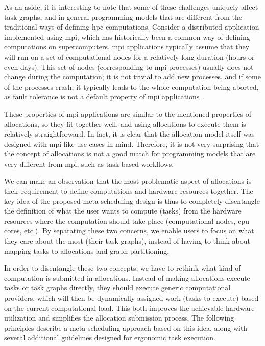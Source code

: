 As an aside, it is interesting to note that some of these challenges uniquely affect task graphs,
and in general programming models that are different from the traditional ways of defining
\gls{hpc} computations. Consider a distributed application implemented using
\gls{mpi}, which has historically been a common way of defining computations on
supercomputers. \gls{mpi} applications typically assume that they will run on a set
of computational nodes for a relatively long duration (hours or even days). This set of nodes
(corresponding to \gls{mpi} processes) usually does not change during the
computation; it is not trivial to add new processes, and if some of the processes crash, it
typically leads to the whole computation being aborted, as fault tolerance is not a default
property of \gls{mpi} applications~\cite{fault_tolerant_mpi}.

These properties of \gls{mpi} applications are similar to the mentioned properties of
allocations, so they fit together well, and using allocations to execute them is relatively
straightforward. In fact, it is clear that the allocation model itself was designed with
\gls{mpi}-like use-cases in mind. Therefore, it is not very surprising that the
concept of allocations is not a good match for programming models that are very different from
\gls{mpi}, such as task-based workflows.

We can make an observation that the most problematic aspect of allocations is their requirement to
define computations and hardware resources together. The key idea of the proposed meta-scheduling
design is thus to completely disentangle the definition of what the user wants to compute (tasks)
from the hardware resources where the computation should take place (computational nodes,
\gls{cpu} cores, etc.). By separating these two concerns, we enable users to focus on
what they care about the most (their task graphs), instead of having to think about mapping tasks
to allocations and graph partitioning.

In order to disentangle these two concepts, we have to rethink what kind of computation is
submitted in allocations. Instead of making allocations execute tasks or task graphs directly, they
should execute generic computational providers, which will then be dynamically assigned work (tasks
to execute) based on the current computational load. This both improves the achievable hardware
utilization and simplifies the allocation submission process. The following principles describe a
meta-scheduling approach based on this idea, along with several additional guidelines designed for
ergonomic task execution.

